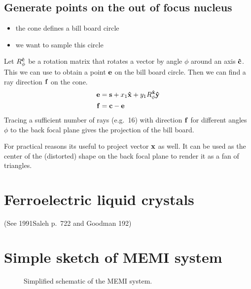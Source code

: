 \documentclass[twocolumn,DIV19]{scrartcl}
\begin{document}
\subsection{Generate points on the out of focus nucleus}
\begin{itemize}
\item the cone defines a bill board circle
\item we want to sample this circle
\end{itemize}
Let $R_\phi^{\mathbf{\hat{c}}}$ be a rotation matrix that rotates a vector by angle
$\phi$ around an axis $\mathbf{\hat{c}}$. This we can use to obtain a point $\mathbf{e}$
on the bill board circle. Then we can find a ray direction $\mathbf{f}$ on the
cone.
\begin{align}
  \mathbf{e}&=\mathbf{s}+x_1\mathbf{\hat{x}}+y_1R_\phi^{\mathbf{\hat{x}}}\mathbf{\hat{y}}\\
  \mathbf{f}&=\mathbf{c}-\mathbf{e}
\end{align}
Tracing a sufficient number of rays (e.g.\ 16) with direction $\mathbf{f}$ for
different angles $\phi$ to the back focal plane gives the projection
of the bill board.

For practical reasons its useful to project vector $\mathbf{x}$ as well. It
can be used as the center of the (distorted) shape on the back focal
plane to render it as a fan of triangles.
\newcommand{\figref}[1]{\figurename~\ref{#1}}

\section{Ferroelectric liquid crystals}
(See 1991Saleh p.~722 and Goodman 192)

\section{Simple sketch of MEMI system}
\begin{figure}[!hbt]
  \centering
  
  \caption{Simplified schematic of the MEMI system.}
\end{figure}
\end{document}
